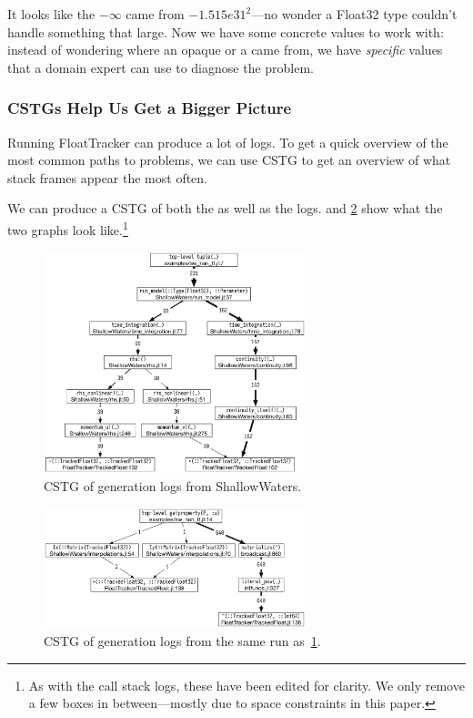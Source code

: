 \documentclass{juliacon}
\begin{document}
It looks like the $-\infty$ came from $-1.515e31^2$---no wonder a Float32 type couldn't handle something that large.
Now we have some concrete values to work with: instead of wondering where an opaque \Inf{} or a \NaN{} came from, we have \emph{specific} values that a domain expert can use to diagnose the problem.

\subsubsection{CSTGs Help Us Get a Bigger Picture}

Running FloatTracker can produce a lot of logs.
To get a quick overview of the most common paths to problems, we can use CSTG to get an overview of what stack frames appear the most often.

We can produce a CSTG of both the \Inf{} as well as the \NaN{} logs.
 and \cref{fig:sw_inf_cstg} show what the two graphs look like.\footnote{As with the call stack logs, these have been edited for clarity. We only remove a few boxes in between—mostly due to space constraints in this paper.}


\begin{figure}[ht]
  \centering
  \includegraphics[width=3in]{fig/sw_nan_cstg_clean.png}
  \caption{CSTG of \NaN{} generation logs from ShallowWaters.}
  \label{fig:sw_nan_cstg}
\end{figure}

\begin{figure}[ht]
  \centering
  \includegraphics[width=3in]{fig/sw_inf_cstg_clean.png}
  \caption{CSTG of \Inf{} generation logs from the same run as~\cref{fig:sw_nan_cstg}.}
  \label{fig:sw_inf_cstg}
\end{figure}
\end{document}
